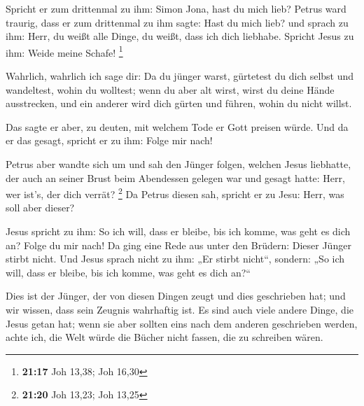  Spricht er zum drittenmal zu ihm: Simon Jona, hast du
mich lieb? Petrus ward traurig, dass er zum drittenmal zu ihm sagte:
Hast du mich lieb? und sprach zu ihm: Herr, du weißt alle Dinge, du
weißt, dass ich dich liebhabe. Spricht Jesus zu ihm: Weide meine Schafe!
\footnote{\textbf{21:17} Joh 13,38; Joh 16,30}

 Wahrlich, wahrlich ich sage dir: Da du jünger warst,
gürtetest du dich selbst und wandeltest, wohin du wolltest; wenn du aber
alt wirst, wirst du deine Hände ausstrecken, und ein anderer wird dich
gürten und führen, wohin du nicht willst.

 Das sagte er aber, zu deuten, mit welchem Tode er Gott
preisen würde. Und da er das gesagt, spricht er zu ihm: Folge mir nach!

 Petrus aber wandte sich um und sah den Jünger folgen,
welchen Jesus liebhatte, der auch an seiner Brust beim Abendessen
gelegen war und gesagt hatte: Herr, wer ist's, der dich verrät?
\footnote{\textbf{21:20} Joh 13,23; Joh 13,25}  Da Petrus
diesen sah, spricht er zu Jesu: Herr, was soll aber dieser?

 Jesus spricht zu ihm: So ich will, dass er bleibe, bis
ich komme, was geht es dich an? Folge du mir nach!  Da
ging eine Rede aus unter den Brüdern: Dieser Jünger stirbt nicht. Und
Jesus sprach nicht zu ihm: „Er stirbt nicht``, sondern: „So ich will,
dass er bleibe, bis ich komme, was geht es dich an?{}``

 Dies ist der Jünger, der von diesen Dingen zeugt und
dies geschrieben hat; und wir wissen, dass sein Zeugnis wahrhaftig ist.
 Es sind auch viele andere Dinge, die Jesus getan hat;
wenn sie aber sollten eins nach dem anderen geschrieben werden, achte
ich, die Welt würde die Bücher nicht fassen, die zu schreiben wären.
